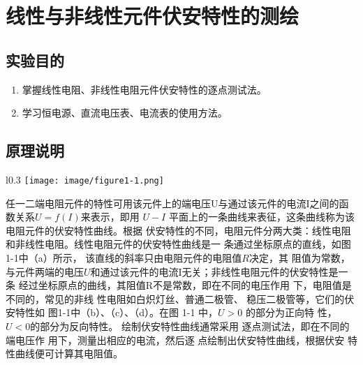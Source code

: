 \documentclass[UTF8]{article}
\begin{document}
    \section{线性与非线性元件伏安特性的测绘}
        \subsection{实验目的}
            \begin{enumerate}[label=\textbf{\arabic*}.]
                \item 掌握线性电阻、非线性电阻元件伏安特性的逐点测试法。
                \item 学习恒电源、直流电压表、电流表的使用方法。
            \end{enumerate}
        \subsection{原理说明}
        \noindent\hspace{2em}
            \begin{wrapfigure}{l}{0.3\textwidth}
                \centering
                \texttt{[image: image/figure1-1.png]}
            \end{wrapfigure}任一二端电阻元件的特性可用该元件上的端电压U与通过该元件的电流I之间的函数关系$U=
            f(I)$来表示，即用 $U-I$ 平面上的一条曲线来表征，这条曲线称为该电阻元件的伏安特性曲线。根据
            伏安特性的不同，电阻元件分两大类：线性电阻和非线性电阻。线性电阻元件的伏安特性曲线是一
            条通过坐标原点的直线，如图1-1中（a）所示，
            该直线的斜率只由电阻元件的电阻值$R$决定，其
            阻值为常数，与元件两端的电压$U$和通过该元件的电流I无关；非线性电阻元件的伏安特性是一条
            经过坐标原点的曲线，其阻值R不是常数，即在不同的电压作用
            下，电阻值是不同的，常见的非线
            性电阻如白炽灯丝、普通二极管、
            稳压二极管等，它们的伏安特性如
            图1-1中（b）、（c）、（d）。在图
            1-1 中，$U > 0$ 的部分为正向特
            性，$U < 0$的部分为反向特性。 
            绘制伏安特性曲线通常采用
            逐点测试法，即在不同的端电压作
            用下，测量出相应的电流，然后逐
            点绘制出伏安特性曲线，根据伏安
            特性曲线便可计算其电阻值。
            \newline
\end{document}

